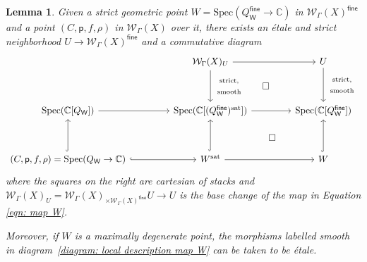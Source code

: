 \documentclass{article}
\def\C{\mathbb{C}}
\def\WG{\mathcal{W}_{\Gamma}}
\newtheorem{lemma}[definition]{Lemma}
\newcommand{\sat}{\mathrm{sat}}
\newcommand{\fine}{\mathsf{fine}}
\newcommand{\W}{\mathsf{W}}
\begin{document}
\begin{lemma}

Given a strict geometric point $ W= \mathrm{Spec}(Q_{\W}^{\mathsf{fine}} \to \C)$ in $\WG(X)^{\mathsf{fine}}$ and a point $(C,\mathsf{p},f, \rho)$ in $\WG(X)$ over it, there exists an étale and strict neighborhood $U \to \WG(X)^{\fine}$ and a commutative diagram
\begin{equation}\label{diagram: local description map W}
\begin{tikzcd}[row sep=1.2cm, column sep=1.5cm]
& \WG(X)_{U} \arrow[r] \arrow[d, "{\begin{array}{c}\mathrm{strict,} \\  \mathrm{smooth}\end{array}}"] & U  \arrow[d, "{\begin{array}{c}\mathrm{strict,} \\  \mathrm{smooth}\end{array}}"]   \\
\mathrm{Spec}(\C[Q_{\W}]) \arrow[r] & \mathrm{Spec}(\C[(Q_{\W}^{\mathsf{fine}})^{\sat}]) \arrow[r] & \mathrm{Spec}(\C[Q_{\W}^{\mathsf{fine}}])  \arrow[ul, phantom, "\square"] \\
(C,\mathsf{p},f, \rho)=\mathrm{Spec}(Q_{\W} \to \C) \arrow[r, hook] \arrow[u, hook] & W^{\mathrm{sat}} \arrow[r] \arrow[u, hook] & W \arrow[u, hook]
\arrow[ul, phantom, "\square"]
\end{tikzcd}
\end{equation}
where the squares on the right are cartesian of stacks and $\WG(X)_{U}=\WG(X)_{\times \WG(X)^{\fine}}U \to U$ is the base change of the map in Equation \eqref{eqn: map W}.

Moreover, if $W$ is a maximally degenerate point, the morphisms labelled smooth in diagram~\eqref{diagram: local description map W} can be taken to be étale.

\end{lemma}
\end{document}
